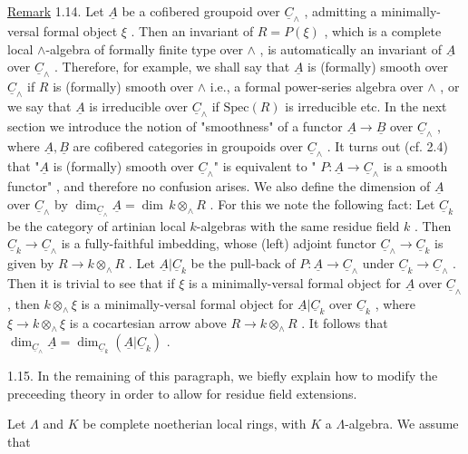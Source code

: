 \underline{Remark} 1.14.  Let  $\underline{A}$  be a cofibered groupoid over  $\underline{C}_\wedge$  , admitting a minimally-versal formal object  $\xi$  . Then an invariant of  $R = P(\xi)$  , which is a complete local  $\wedge$-algebra of formally finite type over  $\wedge$  , is automatically an invariant of  $\underline{A}$  over  $\underline{C}_\wedge$  . Therefore, for example, we shall say that  $\underline{A}$  is (formally) smooth over  $\underline{C}_\wedge$  if  $R$  is (formally) smooth over  $\wedge$  i.e., a formal power-series algebra over  $\wedge$  , or we say that  $\underline{A}$  is irreducible over  $\underline{C}_\wedge$  if  $\mathrm{Spec}(R)$  is irreducible etc. In the next section we introduce the notion of  "smoothness"  of a functor  $\underline{A} \to \underline{B}$  over  $\underline{C}_\wedge$  , where  $\underline{A}, \underline{B}$  are cofibered categories in groupoids over  $\underline{C}_\wedge$  . It turns out (cf. 2.4) that  "$\underline{A}$  is (formally) smooth over  $\underline{C}_\wedge$"  is equivalent to  " $P : \underline{A} \to \underline{C}_\wedge$  is a smooth functor"  , and therefore no confusion arises. We also define the dimension of  $\underline{A}$  over  $\underline{C}_\wedge$  by  $\dim_{\underline{C}_\wedge} \underline{A} = \dim\, k \otimes_\wedge R$  . For this we note the following fact:  Let  $\underline{C}_k$  be the category of artinian local $k$-algebras with the same residue field  $k$  . Then  $\underline{C}_k \to \underline{C}_\wedge$  is a fully-faithful imbedding, whose (left) adjoint functor  $\underline{C}_\wedge \to \underline{C}_k$  is given by  $R \to k \otimes_\wedge R$  . Let $\underline{A}|\underline{C}_k$  be the pull-back of  $P : \underline{A} \to \underline{C}_\wedge$  under  $\underline{C}_k \to \underline{C}_\wedge$  . Then it is trivial to see that if  $\xi$  is a minimally-versal formal object for  $\underline{A}$  over  $\underline{C}_\wedge$  , then  $k \otimes_\wedge \xi$ is a minimally-versal formal object for  $\underline{A}|\underline{C}_k$  over  $\underline{C}_k$  , where  $\xi \to k \otimes_\wedge \xi$  is a cocartesian arrow above  $R \to k \otimes_\wedge R$  . It follows that  $\dim_{\underline{C}_\wedge} \underline{A} = \dim_{\underline{C}_k} (\underline{A}|\underline{C}_k)$  .



1.15.  In the remaining of this paragraph, we biefly explain how to modify the preceeding theory in order to allow for residue field extensions.

Let $\Lambda$ and $K$ be complete noetherian local rings, with $K$ a $\Lambda$-algebra. We assume that

